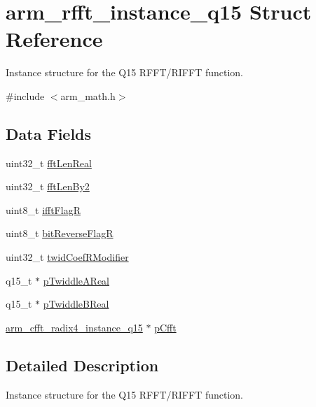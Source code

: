 \hypertarget{structarm__rfft__instance__q15}{\section{arm\-\_\-rfft\-\_\-instance\-\_\-q15 Struct Reference}
\label{structarm__rfft__instance__q15}
}


Instance structure for the Q15 R\-F\-F\-T/\-R\-I\-F\-F\-T function.  




{\ttfamily \#include $<$arm\-\_\-math.\-h$>$}

\subsection*{Data Fields}
\begin{DoxyCompactItemize}
\item 
uint32\-\_\-t \hyperlink{structarm__rfft__instance__q15_adf0d4604cf5546075d9d4cf122d6c986}{fft\-Len\-Real}
\item 
uint32\-\_\-t \hyperlink{structarm__rfft__instance__q15_ae7db13e0e2999656d98c4223de5b1284}{fft\-Len\-By2}
\item 
uint8\-\_\-t \hyperlink{structarm__rfft__instance__q15_a787d72055c89e4d62b188d6bd646341c}{ifft\-Flag\-R}
\item 
uint8\-\_\-t \hyperlink{structarm__rfft__instance__q15_ad56ec2425e2422108b8767b43d944591}{bit\-Reverse\-Flag\-R}
\item 
uint32\-\_\-t \hyperlink{structarm__rfft__instance__q15_a5b06f7f76c018db993fe6acc5708c589}{twid\-Coef\-R\-Modifier}
\item 
q15\-\_\-t $\ast$ \hyperlink{structarm__rfft__instance__q15_ac17beaa033ab1ea242d49037276b67e2}{p\-Twiddle\-A\-Real}
\item 
q15\-\_\-t $\ast$ \hyperlink{structarm__rfft__instance__q15_a67a618de57c3a7420ee05fda1a80bf3a}{p\-Twiddle\-B\-Real}
\item 
\hyperlink{structarm__cfft__radix4__instance__q15}{arm\-\_\-cfft\-\_\-radix4\-\_\-instance\-\_\-q15} $\ast$ \hyperlink{structarm__rfft__instance__q15_ae0ac7c3a89699793fc0dac960db7f056}{p\-Cfft}
\end{DoxyCompactItemize}


\subsection{Detailed Description}
Instance structure for the Q15 R\-F\-F\-T/\-R\-I\-F\-F\-T function. 

